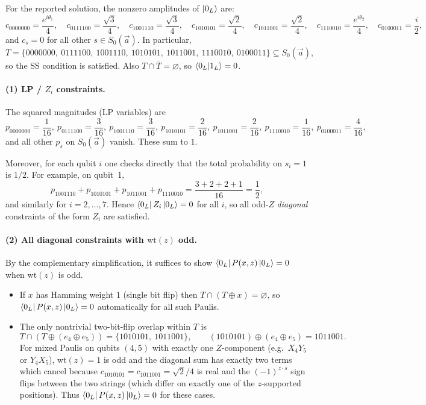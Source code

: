 \documentclass[11pt]{article}
\begin{document}
For the reported solution, the nonzero amplitudes of $\ket{0_L}$ are:
\[
c_{0000000}=\frac{e^{i\theta_1}}{4},\quad
c_{0111100}=\frac{\sqrt3}{4},\quad
c_{1001110}=\frac{\sqrt3}{4},\quad
c_{1010101}=\frac{\sqrt2}{4},\quad
c_{1011001}=\frac{\sqrt2}{4},\quad
c_{1110010}=\frac{e^{i\theta_2}}{4},\quad
c_{0100011}=\frac{i}{2},
\]
and $c_s=0$ for all other $s\in S_0(\vec a)$.
In particular,
\[
T=\{0000000,\ 0111100,\ 1001110,\ 1010101,\ 1011001,\ 1110010,\ 0100011\}
\subseteq S_0(\vec a),
\]
so the SS condition is satisfied. Also $T\cap\overline{T}=\varnothing$, so $\braket{0_L|1_L}=0$.

\paragraph{(1) LP / $Z_i$ constraints.}
The squared magnitudes (LP variables) are
\[
p_{0000000}=\frac{1}{16},\ 
p_{0111100}=\frac{3}{16},\ 
p_{1001110}=\frac{3}{16},\ 
p_{1010101}=\frac{2}{16},\ 
p_{1011001}=\frac{2}{16},\ 
p_{1110010}=\frac{1}{16},\ 
p_{0100011}=\frac{4}{16},
\]
and all other $p_s$ on $S_0(\vec a)$ vanish. These sum to $1$.

Moreover, for each qubit $i$ one checks directly that the total probability on $s_i=1$ is $1/2$.
For example, on qubit~1,
\[
p_{1001110}+p_{1010101}+p_{1011001}+p_{1110010}
=\frac{3+2+2+1}{16}=\frac12,
\]
and similarly for $i=2,\dots,7$. Hence $\bra{0_L}Z_i\ket{0_L}=0$ for all $i$, so all odd-$Z$ \emph{diagonal}
constraints of the form $Z_i$ are satisfied.

\paragraph{(2) All diagonal constraints with $\mathrm{wt}(z)$ odd.}
By the complementary simplification, it suffices to show $\bra{0_L}P(x,z)\ket{0_L}=0$ when $\mathrm{wt}(z)$ is odd.

\begin{itemize}
\item If $x$ has Hamming weight $1$ (single bit flip) then $T\cap(T\oplus x)=\varnothing$, so
$\bra{0_L}P(x,z)\ket{0_L}=0$ automatically for all such Paulis.
\item The only nontrivial two-bit-flip overlap within $T$ is
\[
T\cap (T\oplus (e_4\oplus e_5))=\{1010101,\ 1011001\},
\qquad
(1010101)\oplus(e_4\oplus e_5)=1011001.
\]
For mixed Paulis on qubits $(4,5)$ with exactly one $Z$-component (e.g.\ $X_4Y_5$ or $Y_4X_5$),
$\mathrm{wt}(z)=1$ is odd and the diagonal sum has exactly two terms which cancel because
$c_{1010101}=c_{1011001}=\sqrt2/4$ is real and the $(-1)^{z\cdot s}$ sign flips between the two strings
(which differ on exactly one of the $z$-supported positions). Thus $\bra{0_L}P(x,z)\ket{0_L}=0$ for these cases.
\end{itemize}
\end{document}
